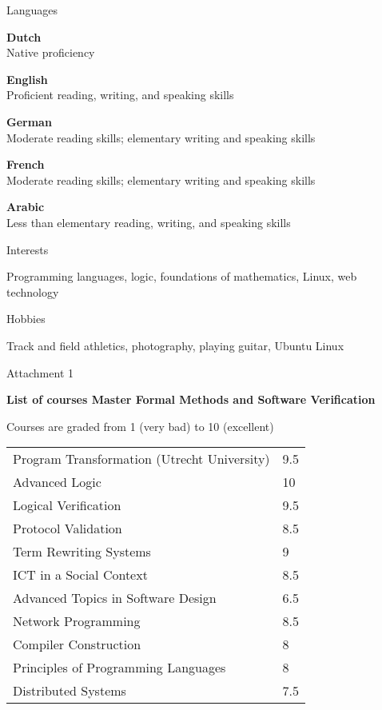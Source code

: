 \documentclass[a4paper,11pt]{article}
\begin{document}
\begin{cv}{}
\begin{cvlist}{Languages}
\item
  {\bf Dutch}\\
  Native proficiency
\item
  {\bf English}\\
  Proficient reading, writing, and speaking skills
\item
  {\bf German}\\
  Moderate reading skills; elementary writing and speaking skills
\item
  {\bf French}\\
  Moderate reading skills; elementary writing and speaking skills
\item
  {\bf Arabic}\\
  Less than elementary reading, writing, and speaking skills
\end{cvlist}


\begin{cvlist}{Interests}
\item Programming languages, logic, foundations of mathematics, Linux, web technology
\end{cvlist}


\begin{cvlist}{Hobbies}
\item Track and field athletics, photography, playing guitar, Ubuntu Linux
\end{cvlist}


\pagebreak


\begin{cvlist}{Attachment 1}
  \item {\bf List of courses Master Formal Methods and Software Verification}
  \item Courses are graded from 1 (very bad) to 10 (excellent)
  \item
  \begin{tabular}{p{23em}l}
    Program Transformation (Utrecht University) & 9.5\\
    Advanced Logic & 10\\
    Logical Verification & 9.5\\
    Protocol Validation & 8.5\\
    Term Rewriting Systems & 9\\
    ICT in a Social Context & 8.5\\
    Advanced Topics in Software Design & 6.5\\
    Network Programming & 8.5\\
    Compiler Construction & 8\\
    Principles of Programming Languages & 8\\
    Distributed Systems & 7.5
  \end{tabular}
\end{cvlist}



\end{cv}
\end{document}

